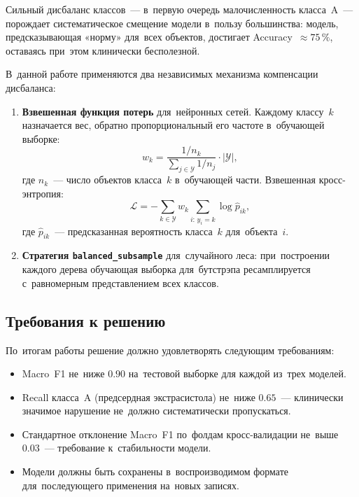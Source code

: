 Сильный дисбаланс классов~--- в~первую очередь малочисленность
класса~A~--- порождает систематическое смещение модели в~пользу
большинства: модель, предсказывающая «норму» для~всех объектов,
достигает Accuracy~$\approx 75\,\%$, оставаясь при~этом клинически
бесполезной.

В~данной работе применяются два независимых механизма компенсации
дисбаланса:

\begin{enumerate}
    \item \textbf{Взвешенная функция потерь} для~нейронных сетей.
    Каждому классу~$k$ назначается вес, обратно пропорциональный
    его частоте в~обучающей выборке:
    \begin{equation}
        \label{eq:weights}
        w_k = \frac{1/n_k}{\sum_{j \in \mathcal{Y}} 1/n_j}
        \cdot |\mathcal{Y}|,
    \end{equation}
    где $n_k$~--- число объектов класса~$k$ в~обучающей части.
    Взвешенная кросс-энтропия:
    \begin{equation}
        \label{eq:wce}
        \mathcal{L} = -\sum_{k \in \mathcal{Y}} w_k \sum_{i:\,y_i=k}
        \log \hat{p}_{ik},
    \end{equation}
    где $\hat{p}_{ik}$~--- предсказанная вероятность класса~$k$
    для~объекта~$i$.

    \item \textbf{Стратегия \texttt{balanced\_subsample}} для~случайного
    леса: при~построении каждого дерева обучающая выборка
    для~бутстрэпа ресамплируется с~равномерным представлением
    всех классов.
\end{enumerate}

\subsection{Требования к решению}

По~итогам работы решение должно удовлетворять следующим требованиям:

\begin{itemize}
    \item Macro~F1 не~ниже $0.90$ на~тестовой выборке для каждой
          из~трех моделей.
    \item Recall класса~A (предсердная экстрасистола) не~ниже $0.65$~---
          клинически значимое нарушение не~должно систематически
          пропускаться.
    \item Стандартное отклонение Macro~F1 по~фолдам кросс-валидации
          не~выше~$0.03$~--- требование к~стабильности модели.
    \item Модели должны быть сохранены в~воспроизводимом формате
          для~последующего применения на~новых записях.
\end{itemize}
